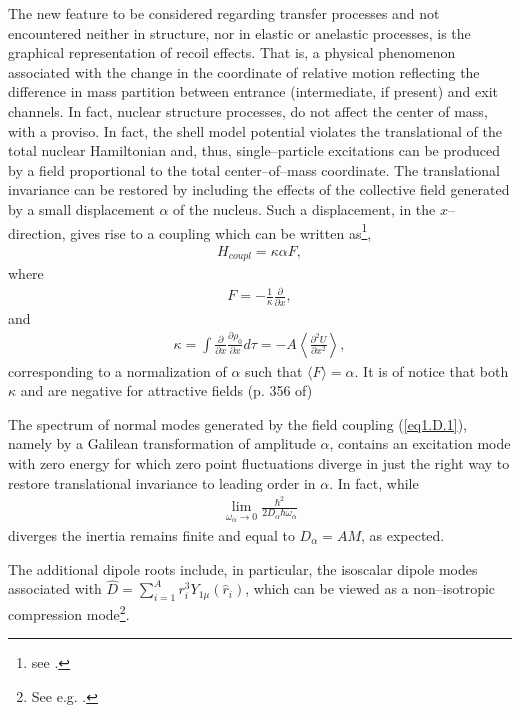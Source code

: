 \begin{subappendices}
The new feature to be considered regarding transfer processes and not encountered neither in structure, nor in elastic or anelastic processes, is the graphical representation of recoil effects. That is, a physical phenomenon associated with the change in the coordinate of relative motion reflecting the difference in mass partition between entrance (intermediate, if present) and exit channels. In fact, nuclear structure processes, do not affect the center of mass, with a proviso. In fact, the shell model potential violates the translational of the total nuclear Hamiltonian and, thus, single--particle excitations can be produced by a field proportional to the total center--of--mass coordinate. The translational invariance can be restored by including  the effects of the collective field generated by a small displacement $\alpha$ of the nucleus. Such a displacement, in the $x$--direction, gives rise to a coupling which can be written as\footnote{\label{foot63}see \cite{Bohr:75}.},
\begin{align}\label{eq1.D.1}
H_{coupl}=\kappa\alpha F,
\end{align}
where 
\begin{align}\label{eq1.D.2}
F=-\frac{1}{\kappa}\frac{\partial}{\partial x},
\end{align}
and
\begin{align}\label{eq1.D.3}
\kappa=\int\frac{\partial}{\partial x}\frac{\partial \rho_0}{\partial x}d\tau=-A\left\langle\frac{\partial^2U}{\partial x^2}\right\rangle,
\end{align}
corresponding to a normalization of $\alpha$ such that $\langle F\rangle=\alpha$. It is of notice that both $\kappa$ and are negative for attractive fields (p. 356 of\footnotemark[\ref{foot63}])


The spectrum  of normal modes generated by the field coupling (\ref{eq1.D.1}), namely by a Galilean transformation of amplitude $\alpha$, contains an excitation mode with zero energy for which zero point fluctuations diverge in just the right way to restore translational invariance to leading order in $\alpha$. In fact, while
\begin{align}\label{eq1.D.4}
\lim_{\omega_\alpha\rightarrow 0}\frac{\hbar^2}{2D_\alpha\hbar\omega_\alpha}
\end{align}
diverges the inertia remains finite and equal to $D_\alpha=AM$, as expected.


The additional dipole roots include, in particular, the isoscalar dipole modes associated with $\hat D=\sum_{i=1}^{A}r^3_iY_{1\mu}(\hat r_i)$, which can be viewed as a non--isotropic compression mode\footnote{See e.g. \cite{Colo:00}.}.


\end{subappendices}
